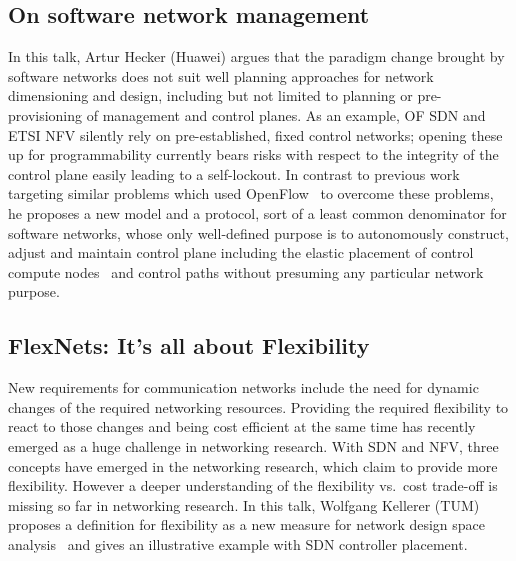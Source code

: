 \subsection{On software network management}

In this talk, Artur Hecker (Huawei) argues that the paradigm change brought by
software networks does not suit well planning approaches for network
dimensioning and design, including but not limited to planning or
pre-provisioning of management and control planes. As an example, OF \ac{SDN}
and ETSI \ac{NFV} silently rely on pre-established, fixed control networks;
opening these up for programmability currently bears risks
\cite{lschiff:dsn:2016} with respect to the integrity of the control plane
easily leading to a self-lockout.  In contrast to previous work targeting
similar problems which used OpenFlow~\cite{lschiff:ccr:2016} to overcome these
problems, he proposes a new model and a protocol, sort of a least common
denominator for software networks, whose only well-defined purpose is to
autonomously construct, adjust and maintain control plane including the
elastic placement of control compute nodes~\cite{yliu:icc:2015} and control
paths without presuming any particular network purpose.

\subsection{FlexNets: It's all about Flexibility}

New requirements for communication networks include the need for dynamic
changes of the required networking resources. Providing the required
flexibility to react to those changes and being cost efficient at the same
time has recently emerged as a huge challenge in networking research. With
\ac{SDN} and \ac{NFV}, three concepts have emerged in the networking research,
which claim to provide more flexibility. However a deeper understanding of the
flexibility vs.\ cost trade-off is missing so far in networking research. In
this talk, Wolfgang Kellerer (TUM) proposes a definition for flexibility as a
new measure for network design space analysis~\cite{wkellerer:infocom:2016}
and gives an illustrative example with \ac{SDN} controller placement.

